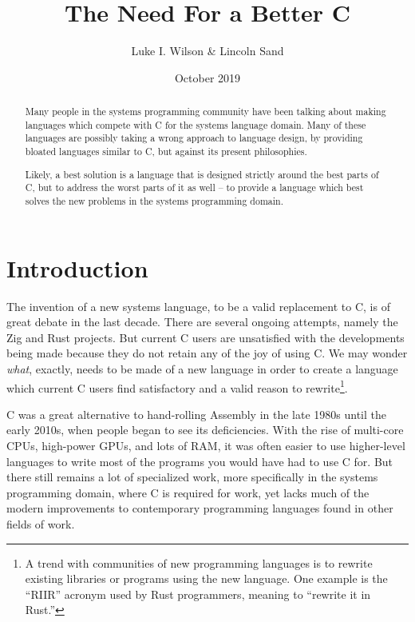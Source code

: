 \documentclass{article}
\title{The Need For a Better C}
\author{Luke I. Wilson & Lincoln Sand}
\date{October 2019}
\begin{document}
\maketitle

\begin{abstract} %
    Many people in the systems programming community have been talking about making languages which compete with C for the systems language domain. Many of these languages are possibly taking a wrong approach to language design, by providing bloated languages similar to C, but against its present philosophies.
    
    Likely, a best solution is a language that is designed strictly around the best parts of C, but to address the worst parts of it as well -- to provide a language which best solves the new problems in the systems programming domain.
    
\end{abstract}

\section{Introduction}
    The invention of a new systems language, to be a valid replacement to C, is of great debate in the last decade. There are several ongoing attempts, namely the Zig and Rust projects. But current C users are unsatisfied with the developments being made because they do not retain any of the joy of using C. We may wonder \textit{what}, exactly, needs to be made of a new language in order to create a language which current C users find satisfactory and a valid reason to rewrite\footnote{A trend with communities of new programming languages is to rewrite existing libraries or programs using the new language. One example is the ``RIIR'' acronym used by Rust programmers, meaning to ``rewrite it in Rust.''}.

    C was a great alternative to hand-rolling Assembly in the late 1980s until the early 2010s, when people began to see its deficiencies. With the rise of multi-core CPUs, high-power GPUs, and lots of RAM, it was often easier to use higher-level languages to write most of the programs you would have had to use C for. But there still remains a lot of specialized work, more specifically in the systems programming domain, where C is required for work, yet lacks much of the modern improvements to contemporary programming languages found in other fields of work.
    
\end{document}

